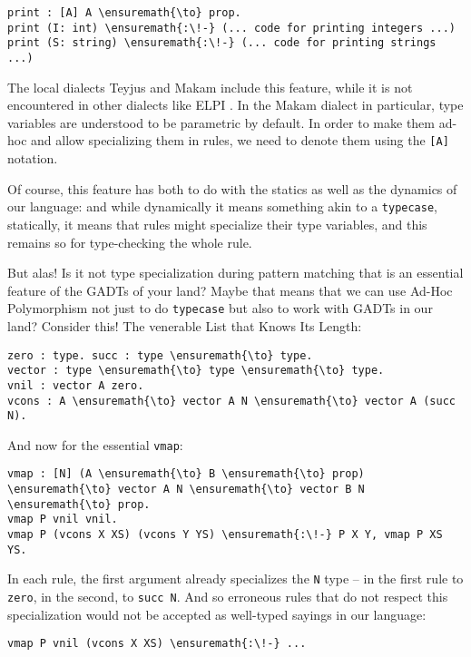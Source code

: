 \begin{verbatim}
print : [A] A \ensuremath{\to} prop.
print (I: int) \ensuremath{:\!-} (... code for printing integers ...)
print (S: string) \ensuremath{:\!-} (... code for printing strings ...)
\end{verbatim}

The local dialects Teyjus
\citep{teyjus-main-reference,teyjus-2-implementation} and Makam include
this feature, while it is not encountered in other dialects like ELPI
\citep{elpi-main-reference}. In the Makam dialect in particular, type
variables are understood to be parametric by default. In order to make
them ad-hoc and allow specializing them in rules, we need to denote them
using the \texttt{{[}A{]}} notation.

Of course, this feature has both to do with the statics as well as the
dynamics of our language: and while dynamically it means something akin
to a \texttt{typecase}, statically, it means that rules might specialize
their type variables, and this remains so for type-checking the whole
rule.

But alas! Is it not type specialization during pattern matching that is
an essential feature of the GADTs of your land? Maybe that means that we
can use Ad-Hoc Polymorphism not just to do \texttt{typecase} but also to
work with GADTs in our land? Consider this! The venerable List that
Knows Its Length:

\begin{verbatim}
zero : type. succ : type \ensuremath{\to} type.
vector : type \ensuremath{\to} type \ensuremath{\to} type.
vnil : vector A zero.
vcons : A \ensuremath{\to} vector A N \ensuremath{\to} vector A (succ N).
\end{verbatim}

And now for the essential \texttt{vmap}:

\begin{verbatim}
vmap : [N] (A \ensuremath{\to} B \ensuremath{\to} prop) \ensuremath{\to} vector A N \ensuremath{\to} vector B N \ensuremath{\to} prop.
vmap P vnil vnil.
vmap P (vcons X XS) (vcons Y YS) \ensuremath{:\!-} P X Y, vmap P XS YS.
\end{verbatim}

In each rule, the first argument already specializes the \texttt{N} type
-- in the first rule to \texttt{zero}, in the second, to
\texttt{succ\ N}. And so erroneous rules that do not respect this
specialization would not be accepted as well-typed sayings in our
language:

\begin{verbatim}
vmap P vnil (vcons X XS) \ensuremath{:\!-} ...
\end{verbatim}

